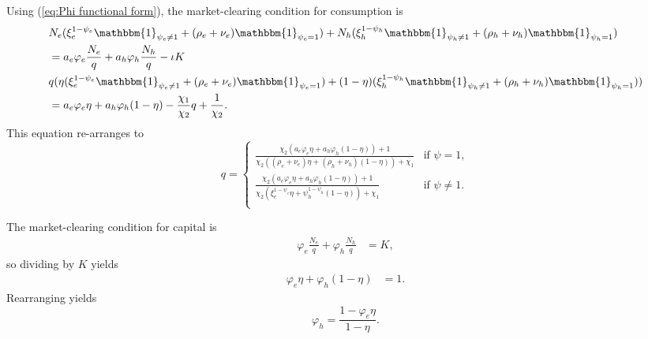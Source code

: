\documentclass[12 pt, oneside]{article}
\theoremstyle{definition}
\theoremstyle{definition}
\theoremstyle{definition}
\begin{document}
Using (\ref{eq:Phi functional form}), the market-clearing condition for consumption is
\begin{align*}
& N_e(\xi_e^{1 - \psi_e}\mathbbm{1}_{\psi_e\neq 1} + (\rho_e + \nu_e)\mathbbm{1}_{\psi_e =1})+  N_h(\xi_h^{1 - \psi_h}\mathbbm{1}_{\psi_h\neq 1} + (\rho_h + \nu_h)\mathbbm{1}_{\psi_h = 1})\\
& =a_e\varphi_e \frac{N_e}{q} + a_h\varphi_h \frac{N_h}{q} - \iota K\\
& q(\eta(\xi_e^{1 - \psi_e}\mathbbm{1}_{\psi_e\neq 1} + (\rho_e + \nu_e)\mathbbm{1}_{\psi_e =1}) + (1 - \eta)(\xi_h^{1 - \psi_h}\mathbbm{1}_{\psi_h\neq 1} + (\rho_h + \nu_h)\mathbbm{1}_{\psi_h = 1}))\\
& =a_e\varphi_e\eta  + a_h\varphi_h (1 - \eta)  - \frac{\chi_1}{\chi_2}q + \frac{1}{\chi_2}.
\end{align*}
This equation re-arranges to %
\begin{equation}
  \label{eq:q closed form}
    q  =
    \begin{cases}
      \frac{\chi_2(a_e \varphi_e \eta + a_h \varphi_h(1 - \eta)) + 1}{\chi_2((\rho_e + \nu_e) \eta + ( \rho_h + \nu_h)(1 - \eta)) + \chi_1} & \text{if }\psi = 1,\\
      \frac{\chi_2(a_e \varphi_e \eta + a_h \varphi_h(1 - \eta)) + 1}{\chi_2( \xi_e^{1 - \psi_e} \eta + \psi_h^{1 - \psi_h}(1 -  \eta)) + \chi_1} & \text{if }\psi \neq 1.\\
    \end{cases}
\end{equation}


The market-clearing condition for capital is
\begin{align*}
  \varphi_e \frac{N_e }{q} + \varphi_h\frac{N_h}{q} & = K,
\end{align*}
so dividing by $K$ yields
\begin{align*}
  \varphi_e\eta + \varphi_h(1 - \eta) & = 1.
\end{align*}
Rearranging yields
\begin{equation}\label{eq:household leverage as function of experts leverage and eta }
  \varphi_h = \frac{1 - \varphi_e\eta}{1 - \eta}.
\end{equation}
\end{document}
